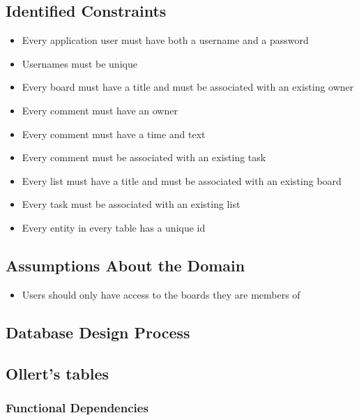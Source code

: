 \documentclass[letterpaper]{article}
\begin{document}
\subsection{Identified Constraints}
\begin{itemize}
  \item{Every application user must have both a username and a password}
  \item{Usernames must be unique}
  \item{Every board must have a title and must be associated with an existing owner}
  \item{Every comment must have an owner}
  \item{Every comment must have a time and text}
  \item{Every comment must be associated with an existing task}
  \item{Every list must have a title and must be associated with an existing board}
  \item{Every task must be associated with an existing list}
  \item{Every entity in every table has a unique id}
\end{itemize}


\subsection{Assumptions About the Domain}
  \begin{itemize}
    \item Users should only have access to the boards they are members of
  \end{itemize}

\subsection{Database Design Process}

\subsection{Ollert's tables}
\subsubsection{Functional Dependencies}
\end{document}
